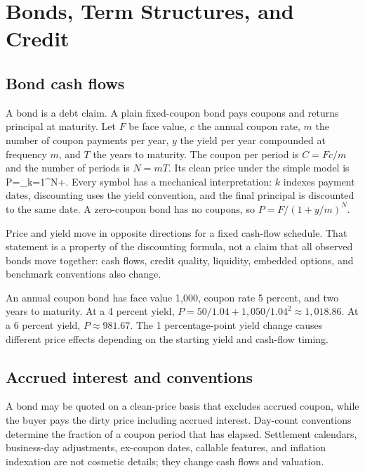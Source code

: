 \chapter{Bonds, Term Structures, and Credit}

\section{Bond cash flows}
A bond is a debt claim. A plain fixed-coupon bond pays coupons and returns principal at maturity. Let $F$ be face value, $c$ the annual coupon rate, $m$ the number of coupon payments per year, $y$ the yield per year compounded at frequency $m$, and $T$ the years to maturity. The coupon per period is $C=Fc/m$ and the number of periods is $N=mT$. Its clean price under the simple model is
  P=\sum_{k=1}^{N}+.
\closeformula
Every symbol has a mechanical interpretation: $k$ indexes payment dates, discounting uses the yield convention, and the final principal is discounted to the same date. A zero-coupon bond has no coupons, so $P=F/(1+y/m)^N$.

Price and yield move in opposite directions for a fixed cash-flow schedule. That statement is a property of the discounting formula, not a claim that all observed bonds move together: cash flows, credit quality, liquidity, embedded options, and benchmark conventions also change.

\begin{worked}
An annual coupon bond has face value 1,000, coupon rate 5 percent, and two years to maturity. At a 4 percent yield, $P=50/1.04+1,050/1.04^2\approx1,018.86$. At a 6 percent yield, $P\approx981.67$. The 1 percentage-point yield change causes different price effects depending on the starting yield and cash-flow timing.
\end{worked}

\section{Accrued interest and conventions}
A bond may be quoted on a clean-price basis that excludes accrued coupon, while the buyer pays the dirty price including accrued interest. Day-count conventions determine the fraction of a coupon period that has elapsed. Settlement calendars, business-day adjustments, ex-coupon dates, callable features, and inflation indexation are not cosmetic details; they change cash flows and valuation.

